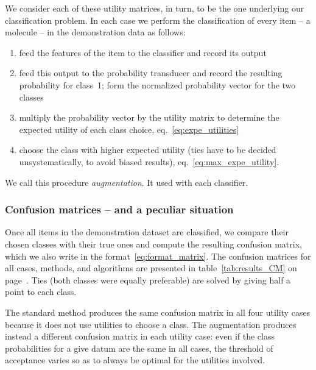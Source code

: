 \documentclass[\ifafour a4paper,12pt,\else a5paper,10pt,\fi%
onecolumn,oneside,article,%
british%
]{memoir}
\theoremstyle{remark}
\theoremstyle{innote}
\renewcommand*{\|}[1][]{\nonscript\:#1\vert\nonscript\:\mathopen{}}
\newcommand*{\sect}{\S}%
\newcommand*{\eqn}{eq.}%
\begin{document}
We consider each of these utility matrices, in turn, to be the one underlying our classification problem. In each case we perform the classification of every item -- a molecule -- in the demonstration data as follows:
\begin{enumerate}[label=\arabic*.]
\item feed the features of the item to the classifier and record its output
\item feed this output to the probability transducer and record the resulting probability for class~1; form the normalized probability vector for the two classes 
\item multiply the probability vector by the utility matrix to determine the expected utility of each class choice, \eqn~\eqref{eq:expe_utilities}
\item choose the class with higher expected utility (ties have to be decided unsystematically, to avoid biased results), \eqn~\eqref{eq:max_expe_utility}.
\end{enumerate}
We call this procedure \emph{augmentation}. It used with each classifier.


\subsubsection{Confusion matrices -- and a peculiar situation}

Once all items in the demonstration dataset are classified, we compare their chosen classes with their true ones and compute the resulting confusion matrix, which we also write in the format~\eqref{eq:format_matrix}. The confusion matrices for all cases, methods, and algorithms are presented in table~\ref{tab:results_CM} on page~\pageref{tab:results_CM}. Ties (both classes were equally preferable) are solved by giving half a point to each class.

The standard method produces the same confusion matrix in all four utility cases because it does not use utilities to choose a class. The augmentation produces instead a different confusion matrix in each utility case: even if the class probabilities for a give datum are the same in all cases, the threshold of acceptance varies so as to always be optimal for the utilities involved.
\end{document}
